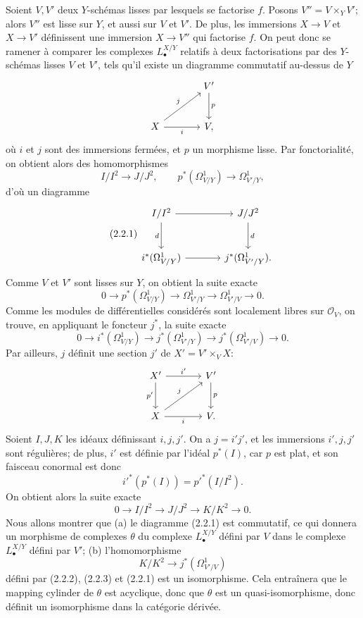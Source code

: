\documentclass[11pt]{article}
\begin{document}
Soient $V,V'$ deux $Y$-schémas lisses par lesquels se factorise $f$. Posons $V''=V\times_Y V'$; alors $V''$ est lisse sur $Y$, et aussi sur $V$ et $V'$. De plus, les immersions $X\to V$ et $X\to V'$ définissent une immersion $X\to V''$ qui factorise $f$. On peut donc se ramener à comparer les complexes $L^{X/Y}_\bullet$ relatifs à deux factorisations par des $Y$-schémas lisses $V$ et $V'$, tels qu'il existe un diagramme commutatif au-dessus de $Y$
\[
\begin{tikzcd}[column sep=large,row sep=large]
& V' \arrow[d,"p"]\\
X \arrow[ur,"j"] \arrow[r,"i"'] & V,
\end{tikzcd}
\]
où $i$ et $j$ sont des immersions fermées, et $p$ un morphisme lisse. Par fonctorialité, on obtient alors des homomorphismes
\[
I/I^2\longrightarrow J/J^2,
\qquad
p^*(\Omega^1_{V/Y})\longrightarrow\Omega^1_{V'/Y},
\]
d'où un diagramme
\begin{equation}\tag{2.2.1}
\begin{tikzcd}[column sep=large,row sep=large]
I/I^2 \arrow[r] \arrow[d,"d"'] & J/J^2 \arrow[d,"d"]\\
i^*(\Omega^1_{V/Y}) \arrow[r] & j^*(\Omega^1_{V'/Y}).
\end{tikzcd}
\end{equation}
Comme $V$ et $V'$ sont lisses sur $Y$, on obtient la suite exacte
\[
0\longrightarrow p^*(\Omega^1_{V/Y})\longrightarrow\Omega^1_{V'/Y}
\longrightarrow\Omega^1_{V'/V}\longrightarrow0.
\]
Comme les modules de différentielles considérés sont localement libres sur $\mathcal O_V$, on trouve, en appliquant le foncteur $j^*$, la suite exacte
\begin{equation}\tag{2.2.2}
0\longrightarrow i^*(\Omega^1_{V/Y})\longrightarrow j^*(\Omega^1_{V'/Y})
\longrightarrow j^*(\Omega^1_{V'/V})\longrightarrow0.
\end{equation}
Par ailleurs, $j$ définit une section $j'$ de $X'=V'\times_V X$:
\[
\begin{tikzcd}[column sep=large,row sep=large]
X' \arrow[r,"i'"] \arrow[d,"p'"'] & V' \arrow[d,"p"]\\
X \arrow[r,"i"'] \arrow[ur,"j"] & V .
\end{tikzcd}
\]
Soient $I,J,K$ les idéaux définissant $i,j,j'$. On a $j=i'j'$, et les immersions $i',j,j'$ sont régulières; de plus, $i'$ est définie par l'idéal $p^*(I)$, car $p$ est plat, et son faisceau conormal est donc
\[
i'^*(p^*(I))=p'^*(I/I^2).
\]
On obtient alors la suite exacte
\begin{equation}\tag{2.2.3}
0\longrightarrow I/I^2\longrightarrow J/J^2\longrightarrow K/K^2\longrightarrow0.
\end{equation}
Nous allons montrer que (a) le diagramme (2.2.1) est commutatif, ce qui donnera un morphisme de complexes $\theta$ du complexe $L^{X/Y}_\bullet$ défini par $V$ dans le complexe $L^{X/Y}_\bullet$ défini par $V'$; (b) l'homomorphisme
\[
K/K^2\longrightarrow j^*(\Omega^1_{V'/V})
\]
défini par (2.2.2), (2.2.3) et (2.2.1) est un isomorphisme. Cela entraînera que le mapping cylinder de $\theta$ est acyclique, donc que $\theta$ est un quasi-isomorphisme, donc définit un isomorphisme dans la catégorie dérivée.
\end{document}
